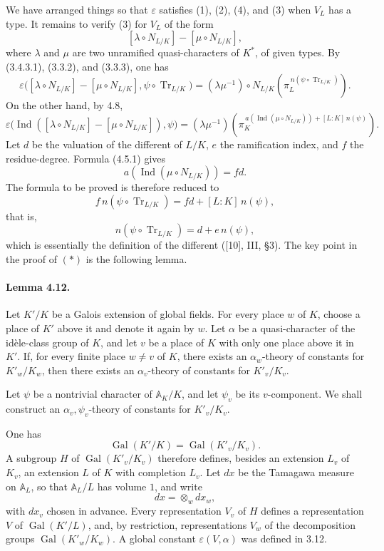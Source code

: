 \documentclass[10pt,letterpaper]{article}
\newcommand{\Gal}{\operatorname{Gal}}
\newcommand{\Ind}{\operatorname{Ind}}
\newcommand{\Tr}{\operatorname{Tr}}
\providecommand{\Gal}{\operatorname{Gal}}
\providecommand{\Gal}{\operatorname{Gal}}
\providecommand{\Tr}{\operatorname{Tr}}
\providecommand{\Gal}{\operatorname{Gal}}
\providecommand{\Tr}{\operatorname{Tr}}
\providecommand{\Gal}{\operatorname{Gal}}
\providecommand{\Tr}{\operatorname{Tr}}
\providecommand{\Ind}{\operatorname{Ind}}
\begin{document}
We have arranged things so that \(\varepsilon\) satisfies (1), (2), (4), and (3) when \(V_L\) has a type. It remains to verify (3) for \(V_L\) of the form
\[
[\lambda\circ N_{L/K}]-[\mu\circ N_{L/K}],
\]
where \(\lambda\) and \(\mu\) are two unramified quasi-characters of \(K^*\), of given types. By (3.4.3.1), (3.3.2), and (3.3.3), one has
\[
\varepsilon\bigl([\lambda\circ N_{L/K}]-[\mu\circ N_{L/K}],
\psi\circ\Tr_{L/K}\bigr)
=
(\lambda\mu^{-1})\circ N_{L/K}
\left(\pi_L^{\,n(\psi\circ\Tr_{L/K})}\right).
\]
On the other hand, by 4.8,
\[
\varepsilon\bigl(\Ind([\lambda\circ N_{L/K}]-[\mu\circ N_{L/K}]),\psi\bigr)
=
(\lambda\mu^{-1})
\left(\pi_K^{\,a(\Ind(\mu\circ N_{L/K}))+[L:K]\,n(\psi)}\right).
\]
Let \(d\) be the valuation of the different of \(L/K\), \(e\) the ramification index, and \(f\) the residue-degree. Formula (4.5.1) gives
\[
a(\Ind(\mu\circ N_{L/K}))=fd.
\]
The formula to be proved is therefore reduced to
\[
f\,n(\psi\circ\Tr_{L/K})=fd+[L:K]\,n(\psi),
\]
that is,
\[
n(\psi\circ\Tr_{L/K})=d+e\,n(\psi),
\]
which is essentially the definition of the different ([10], III, §3). The key point in the proof of \((*)\) is the following lemma.

\paragraph{Lemma 4.12.} Let \(K'/K\) be a Galois extension of global fields. For every place \(w\) of \(K\), choose a place of \(K'\) above it and denote it again by \(w\). Let \(\alpha\) be a quasi-character of the idèle-class group of \(K\), and let \(v\) be a place of \(K\) with only one place above it in \(K'\). If, for every finite place \(w\ne v\) of \(K\), there exists an \(\alpha_w\)-theory of constants for \(K'_w/K_w\), then there exists an \(\alpha_v\)-theory of constants for \(K'_v/K_v\).

Let \(\psi\) be a nontrivial character of \(\mathbb A_K/K\), and let \(\psi_v\) be its \(v\)-component. We shall construct an \(\alpha_v,\psi_v\)-theory of constants for \(K'_v/K_v\).

One has
\[
\Gal(K'/K)=\Gal(K'_v/K_v).
\]
A subgroup \(H\) of \(\Gal(K'_v/K_v)\) therefore defines, besides an extension \(L_v\) of \(K_v\), an extension \(L\) of \(K\) with completion \(L_v\). Let \(dx\) be the Tamagawa measure on \(\mathbb A_L\), so that \(\mathbb A_L/L\) has volume \(1\), and write
\[
dx=\otimes_w dx_w,
\]
with \(dx_v\) chosen in advance. Every representation \(V_v\) of \(H\) defines a representation \(V\) of \(\Gal(K'/L)\), and, by restriction, representations \(V_w\) of the decomposition groups \(\Gal(K'_w/K_w)\). A global constant \(\varepsilon(V,\alpha)\) was defined in 3.12.
\end{document}
